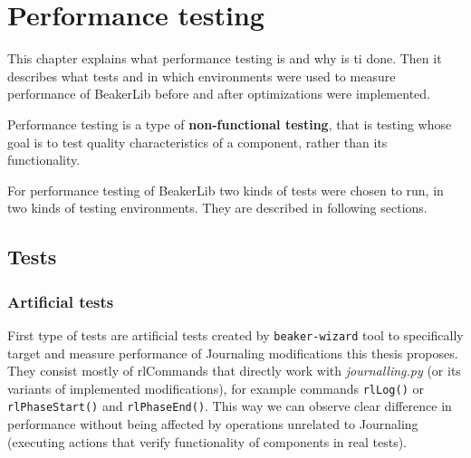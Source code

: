 \chapter{Performance testing}
\label{performance}

This chapter explains what performance testing is and why is ti done. Then it describes what tests and in which environments were used to measure performance of BeakerLib before and after optimizations were implemented.


Performance testing is a type of \textbf{non-functional testing}, that is testing whose goal is to test quality characteristics of a component, rather than its functionality\cite{non-functional_testing}.  %

For performance testing of BeakerLib two kinds of tests were chosen to run, in two kinds of testing environments. They are described in following sections.

\section{Tests}
\label{sec:tests}

\subsection{Artificial tests}
First type of tests are artificial tests created by \texttt{beaker-wizard} tool to specifically target and measure performance of Journaling modifications this thesis proposes. They consist mostly of rlCommands that directly work with \textit{journalling.py} (or its variants of implemented modifications), for example commands \texttt{rlLog()} or \texttt{rlPhaseStart()} and \texttt{rlPhaseEnd()}. This way we can observe clear difference in performance without being affected by operations unrelated to Journaling (executing actions that verify functionality of components in real tests). 

